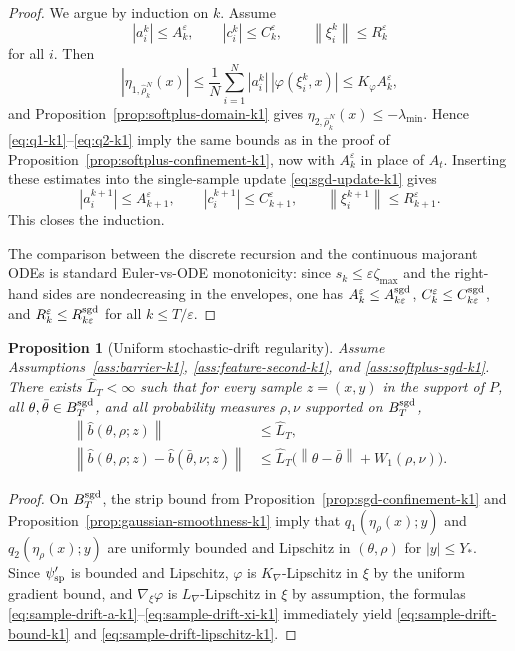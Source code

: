 \documentclass[11pt]{article}
\newtheorem{proposition}[theorem]{Proposition}
\theoremstyle{definition}
\newcommand{\norm}[1]{\left\lVert #1 \right\rVert}
\begin{document}
\begin{proof}
We argue by induction on $k$. Assume
\[
  |a_i^k|\le A_k^\varepsilon,
  \qquad
  |c_i^k|\le C_k^\varepsilon,
  \qquad
  \norm{\xi_i^k}\le R_k^\varepsilon
\]
for all $i$. Then
\[
  |\eta_{1,\hat\rho_k^N}(x)|
  \le
  \frac1N\sum_{i=1}^N |a_i^k|\,|\varphi(\xi_i^k,x)|
  \le
  K_\varphi A_k^\varepsilon,
\]
and Proposition~\ref{prop:softplus-domain-k1} gives
$\eta_{2,\hat\rho_k^N}(x)\le -\lambda_{\min}$. Hence
\eqref{eq:q1-k1}--\eqref{eq:q2-k1} imply the same bounds as in the proof of
Proposition~\ref{prop:softplus-confinement-k1}, now with $A_k^\varepsilon$ in
place of $A_t$. Inserting these estimates into the single-sample update
\eqref{eq:sgd-update-k1} gives
\[
  |a_i^{k+1}|
  \le
  A_{k+1}^\varepsilon,
  \qquad
  |c_i^{k+1}|
  \le
  C_{k+1}^\varepsilon,
  \qquad
  \norm{\xi_i^{k+1}}
  \le
  R_{k+1}^\varepsilon.
\]
This closes the induction.

The comparison between the discrete recursion and the continuous majorant ODEs
is standard Euler-vs-ODE monotonicity: since $s_k\le \varepsilon\zeta_{\max}$ and
the right-hand sides are nondecreasing in the envelopes, one has
$A_k^\varepsilon\le A_{k\varepsilon}^{\rm sgd}$, $C_k^\varepsilon\le
C_{k\varepsilon}^{\rm sgd}$, and $R_k^\varepsilon\le R_{k\varepsilon}^{\rm sgd}$
for all $k\le T/\varepsilon$.
\end{proof}

\begin{proposition}[Uniform stochastic-drift regularity]
\label{prop:sample-drift-regularity-k1}
Assume Assumptions~\ref{ass:barrier-k1}, \ref{ass:feature-second-k1}, and
\ref{ass:softplus-sgd-k1}. There exists
$\widehat L_T<\infty$ such that for every sample $z=(x,y)$ in the support of
$P$, all $\theta,\bar\theta\in B_T^{\rm sgd}$, and all probability measures
$\rho,\nu$ supported on $B_T^{\rm sgd}$,
\begin{align}
  \norm{\hat b(\theta,\rho;z)}
  &\le
  \widehat L_T,
  \label{eq:sample-drift-bound-k1}
  \\
  \norm{\hat b(\theta,\rho;z)-\hat b(\bar\theta,\nu;z)}
  &\le
  \widehat L_T\bigl(\norm{\theta-\bar\theta}+W_1(\rho,\nu)\bigr).
  \label{eq:sample-drift-lipschitz-k1}
\end{align}
\end{proposition}

\begin{proof}
On $B_T^{\rm sgd}$, the strip bound from
Proposition~\ref{prop:sgd-confinement-k1} and
Proposition~\ref{prop:gaussian-smoothness-k1} imply that
$q_1(\eta_\rho(x);y)$ and $q_2(\eta_\rho(x);y)$ are uniformly bounded and
Lipschitz in $(\theta,\rho)$ for $|y|\le Y_\ast$. Since $\psi'_{\rm sp}$ is
bounded and Lipschitz, $\varphi$ is $K_{\nabla}$-Lipschitz in $\xi$ by the
uniform gradient bound, and $\nabla_\xi\varphi$ is $L_{\nabla}$-Lipschitz in
$\xi$ by assumption, the formulas
\eqref{eq:sample-drift-a-k1}--\eqref{eq:sample-drift-xi-k1} immediately yield
\eqref{eq:sample-drift-bound-k1} and \eqref{eq:sample-drift-lipschitz-k1}.
\end{proof}
\end{document}
